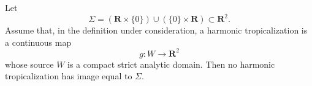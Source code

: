 Let
\[
 \Sigma=(\mathbf R\times\{0\})\cup(\{0\}\times\mathbf R)
 \subset\mathbf R^2.
\]
Assume that, in the definition under consideration, a harmonic
tropicalization is a continuous map
\[
                  g:W\longrightarrow\mathbf R^2
\]
whose source \(W\) is a compact strict analytic domain.  Then no harmonic
tropicalization has image equal to \(\Sigma\).
